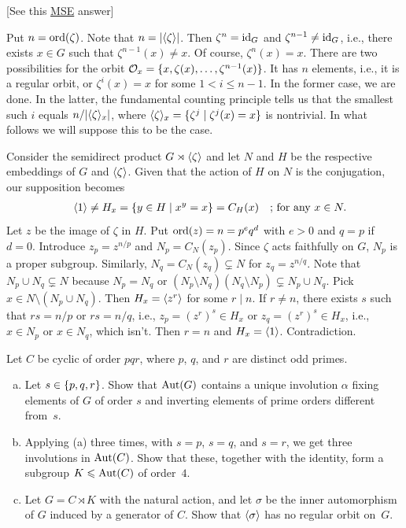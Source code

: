 \begin{solution} {[See this \href{https://math.stackexchange.com/a/2596610/269050}{MSE} answer]}

Put $n={\rm ord}(\zeta)$. Note that $n=|\langle\zeta\rangle|$. Then $\zeta^n=\operatorname{id}_G$ and $\zeta^{n-1}\ne\operatorname{id}_G$, i.e., there exists $x\in G$ such that $\zeta^{n-1}(x)\ne x$. Of course, $\zeta^n(x)=x$. There are two possibilities for the orbit ${\cal O}_x=\{x,\zeta(x),\dots,\zeta^{n-1}(x)\}$. It has $n$ elements, i.e., it is a regular orbit, or $\zeta^i(x)=x$ for some $1<i\le n-1$. In the former case, we are done. In the latter, the fundamental counting principle tells us that the smallest such $i$ equals $n/|\langle\zeta\rangle_x|$, where $\langle\zeta\rangle_x=\{\zeta^j\mid\zeta^j(x)=x\}$ is nontrivial. In what follows we will suppose this to be the case.

Consider the semidirect product $G\rtimes\langle\zeta\rangle$ and let $N$ and $H$ be the respective embeddings of $G$ and $\langle\zeta\rangle$. Given that the action of $H$ on $N$ is the conjugation, our supposition becomes
\begin{align*}
    &\qquad\langle1\rangle\ne H_x = \{y\in H\mid x^y=x\}=C_H(x)&&\text{; for any }x\in N.
\end{align*}
Let $z$ be the image of $\zeta$ in $H$. Put ${\rm ord}(z)=n=p^eq^d$ with $e>0$ and $q=p$ if $d=0$. Introduce $z_p=z^{n/p}$ and $N_p=C_N(z_p)$. Since $\zeta$ acts faithfully on $G$, $N_p$ is a proper subgroup. Similarly, $N_q=C_N(z_q)\varsubsetneq N$ for $z_q=z^{n/q}$. Note that $N_p\cup N_q\varsubsetneq N$ because $N_p=N_q$ or $(N_p\setminus N_q)(N_q\setminus N_p)\varsubsetneq N_p\cup N_q$. Pick $x\in N\setminus(N_p\cup N_q)$. Then $H_x=\langle z^r\rangle$ for some $r\mid n$. If $r\ne n$, there exists $s$ such that $rs=n/p$ or $rs=n/q$, i.e., $z_p=(z^r)^s\in H_x$ or $z_q=(z^r)^s\in H_x$, i.e., $x\in N_p$ or $x\in N_q$, which isn't. Then $r=n$ and $H_x=\langle1\rangle$. Contradiction.  \end{solution}

\begin{probl}
    Let\/ $C$ be cyclic of order\/ $pqr$, where\/ $p$,\/ $q$, and\/ $r$ are distinct odd primes.
    \begin{enumerate}[a),font=\upshape]
        \item Let\/ $s \in \{p, q, r\}$. Show that\/ ${\rm Aut}(G)$ contains a unique involution\/ $\alpha$ fixing elements of\/ $G$ of order\/ $s$ and inverting elements of prime orders different from\/~$s$.
        \item Applying\/ {\upshape(a)} three times, with\/ $s = p$,\/ $s = q$, and\/ $s = r$, we get three involutions in\/ ${\rm Aut}(C)$. Show that these, together with the identity, form a subgroup\/ $K \leqslant {\rm Aut}(C)$ of order\/~$4$.
        \item Let\/ $G = C\rtimes K$ with the natural action, and let\/ $\sigma$ be the inner automorphism of\/ $G$ induced by a generator of\/ $C$. Show that\/ $\langle\sigma\rangle$ has no regular orbit on~$G$.
    \end{enumerate}
\end{probl} 

